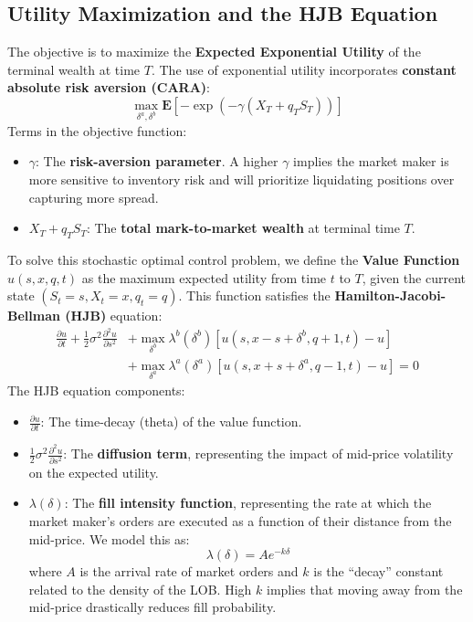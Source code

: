 \subsection{Utility Maximization and the HJB Equation}
The objective is to maximize the \textbf{Expected Exponential Utility} of the terminal wealth at time $T$. The use of exponential utility incorporates \textbf{constant absolute risk aversion (CARA)}:
\begin{equation}
    \max_{\delta^a, \delta^b} \mathbf{E} \left[ -\exp(-\gamma (X_T + q_T S_T)) \right]
\end{equation}
Terms in the objective function:
\begin{itemize}
    \item $\gamma$: The \textbf{risk-aversion parameter}. A higher $\gamma$ implies the market maker is more sensitive to inventory risk and will prioritize liquidating positions over capturing more spread.
    \item $X_T + q_T S_T$: The \textbf{total mark-to-market wealth} at terminal time $T$.
\end{itemize}

To solve this stochastic optimal control problem, we define the \textbf{Value Function} $u(s, x, q, t)$ as the maximum expected utility from time $t$ to $T$, given the current state $(S_t=s, X_t=x, q_t=q)$. This function satisfies the \textbf{Hamilton-Jacobi-Bellman (HJB)} equation:
\begin{equation}
    \begin{split}
        \frac{\partial u}{\partial t} + \frac{1}{2} \sigma^2 \frac{\partial^2 u}{\partial s^2} &+ \max_{\delta^b} \lambda^b(\delta^b) [u(s, x-s+\delta^b, q+1, t) - u] \\
        &+ \max_{\delta^a} \lambda^a(\delta^a) [u(s, x+s+\delta^a, q-1, t) - u] = 0
    \end{split}
\end{equation}
The HJB equation components:
\begin{itemize}
    \item $\frac{\partial u}{\partial t}$: The time-decay (theta) of the value function.
    \item $\frac{1}{2} \sigma^2 \frac{\partial^2 u}{\partial s^2}$: The \textbf{diffusion term}, representing the impact of mid-price volatility on the expected utility.
    \item $\lambda(\delta)$: The \textbf{fill intensity function}, representing the rate at which the market maker's orders are executed as a function of their distance from the mid-price. We model this as:
    \begin{equation}
        \lambda(\delta) = A e^{-k\delta}
    \end{equation}
    where $A$ is the arrival rate of market orders and $k$ is the ``decay'' constant related to the density of the LOB. High $k$ implies that moving away from the mid-price drastically reduces fill probability.
\end{itemize}

